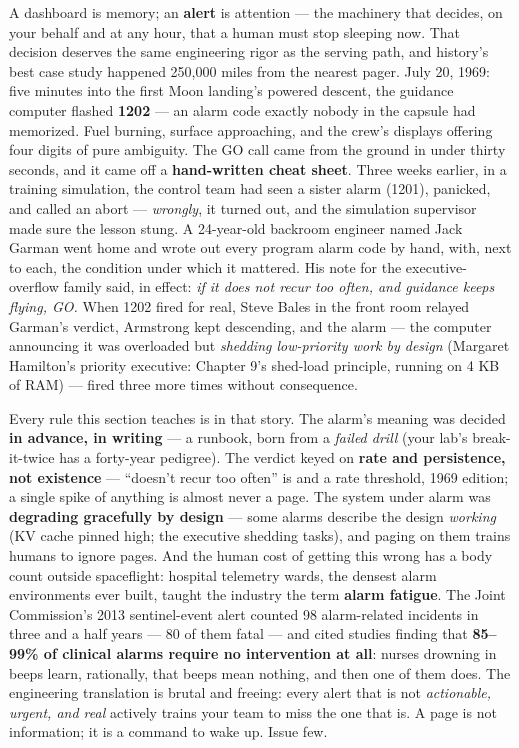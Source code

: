 A dashboard is memory; an \textbf{alert} is attention — the machinery that decides, on your behalf and at any hour, that a human must stop sleeping now. That decision deserves the same engineering rigor as the serving path, and history’s best case study happened 250,000 miles from the nearest pager. July 20, 1969: five minutes into the first Moon landing’s powered descent, the guidance computer flashed \textbf{1202} — an alarm code exactly nobody in the capsule had memorized. Fuel burning, surface approaching, and the crew’s displays offering four digits of pure ambiguity. The GO call came from the ground in under thirty seconds, and it came off a \textbf{hand-written cheat sheet}. Three weeks earlier, in a training simulation, the control team had seen a sister alarm (1201), panicked, and called an abort — \textit{wrongly}, it turned out, and the simulation supervisor made sure the lesson stung. A 24-year-old backroom engineer named Jack Garman went home and wrote out every program alarm code by hand, with, next to each, the condition under which it mattered. His note for the executive-overflow family said, in effect: \textit{if it does not recur too often, and guidance keeps flying, GO.} When 1202 fired for real, Steve Bales in the front room relayed Garman’s verdict, Armstrong kept descending, and the alarm — the computer announcing it was overloaded but \textit{shedding low-priority work by design} (Margaret Hamilton’s priority executive: Chapter 9’s shed-load principle, running on 4 KB of RAM) — fired three more times without consequence.

Every rule this section teaches is in that story. The alarm’s meaning was decided \textbf{in advance, in writing} — a runbook, born from a \textit{failed drill} (your lab’s break-it-twice has a forty-year pedigree). The verdict keyed on \textbf{rate and persistence, not existence} — “doesn’t recur too often” is  and a rate threshold, 1969 edition; a single spike of anything is almost never a page. The system under alarm was \textbf{degrading gracefully by design} — some alarms describe the design \textit{working} (KV cache pinned high; the executive shedding tasks), and paging on them trains humans to ignore pages. And the human cost of getting this wrong has a body count outside spaceflight: hospital telemetry wards, the densest alarm environments ever built, taught the industry the term \textbf{alarm fatigue}. The Joint Commission’s 2013 sentinel-event alert counted 98 alarm-related incidents in three and a half years — 80 of them fatal — and cited studies finding that \textbf{85–99\% of clinical alarms require no intervention at all}: nurses drowning in beeps learn, rationally, that beeps mean nothing, and then one of them does. The engineering translation is brutal and freeing: every alert that is not \textit{actionable, urgent, and real} actively trains your team to miss the one that is. A page is not information; it is a command to wake up. Issue few.

